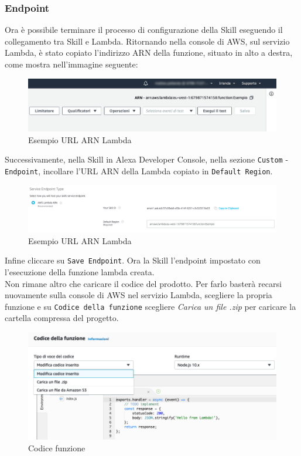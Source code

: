 \subsubsection{Endpoint}
\label{endpoint}
Ora è possibile terminare il processo di configurazione della Skill eseguendo il collegamento tra Skill e Lambda. Ritornando nella console di AWS, sul servizio Lambda, è stato copiato l'indirizzo ARN della funzione, situato in alto a destra, come mostra nell'immagine seguente:
\begin{figure}[H]
	\centering
	\includegraphics[width=13cm]{immagini/aws-lambda3.png}
	\caption{Esempio URL ARN Lambda}
\end{figure}
\noindent Successivamente, nella Skill in Alexa Developer Console, nella sezione \texttt{Custom} - \texttt{Endpoint}, incollare l'URL ARN della Lambda copiato in \texttt{Default Region}.
\begin{figure}[H]
	\centering
	\includegraphics[width=13cm]{immagini/aws-lambda4.png}
	\caption{Esempio URL ARN Lambda}
\end{figure}
\noindent Infine cliccare su \texttt{Save Endpoint}. Ora la Skill l'endpoint impostato con l'esecuzione della funzione lambda creata.\\
Non rimane altro che caricare il codice del prodotto. Per farlo basterà recarsi nuovamente sulla console di AWS nel servizio Lambda, scegliere la propria funzione e su \texttt{Codice della funzione} scegliere \textit{Carica un file .zip} per caricare la cartella compressa del progetto.
\begin{figure}[H]
	\centering
	\includegraphics[width=13cm]{immagini/aws-lambda5.png}
	\caption{Codice funzione}
\end{figure}

